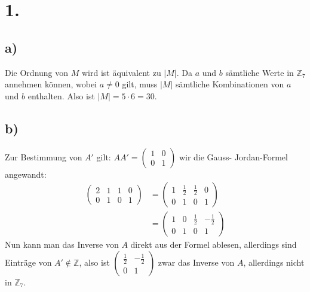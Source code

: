 \documentclass[a4paper]{scrartcl}
\title{\titleinfo}
\author{Arne Struck 6326505}
\date{\today}
\begin{document}
\maketitle
\notag
\section{1.}
	\subsection{a)}		
		Die Ordnung von \(M\) wird ist äquivalent zu \(|M|\). Da \(a\) und \(b\) sämtliche Werte in 
		\(\mathbb{Z}_7\) annehmen können, wobei \(a\neq 0\) gilt, muss \(|M|\) sämtliche 
		Kombinationen von \(a\) und \(b\) enthalten. Also ist \(|M| = 5\cdot 6= 30\). 
		
	\subsection{b)}
		Zur Bestimmung von \(A'\) gilt: \(AA'=\begin{pmatrix}1&0\\0&1\end{pmatrix}\) wir die Gauss-
		Jordan-Formel angewandt: \\
		\begin{align}
			\left(\begin{array}{cc|cc}
			2&1 & 1& 0 \\
			0&1 & 0& 1
			\end{array}\right)&=
			\left(\begin{array}{cc|cc}
			1&\frac{1}{2}&\frac{1}{2}&0 \\
			0&1&0&1
			\end{array}\right) \\
			&= \left(\begin{array}{cc|cc}
			1&0&\frac{1}{2}&-\frac{1}{2} \\
			0&1&0&1
			\end{array}\right)
		\end{align}
		Nun kann man das Inverse von \(A\) direkt aus der Formel ablesen, allerdings sind Einträge 
		von \(A'\notin\mathbb{Z}\), also ist \(\left(\begin{array}{cc} \frac{1}{2}&-\frac{1}{2}\\
		0&1\end{array}\right)\) zwar das Inverse von \(A\), allerdings nicht in \(\mathbb{Z}_7\).
		
\end{document}
